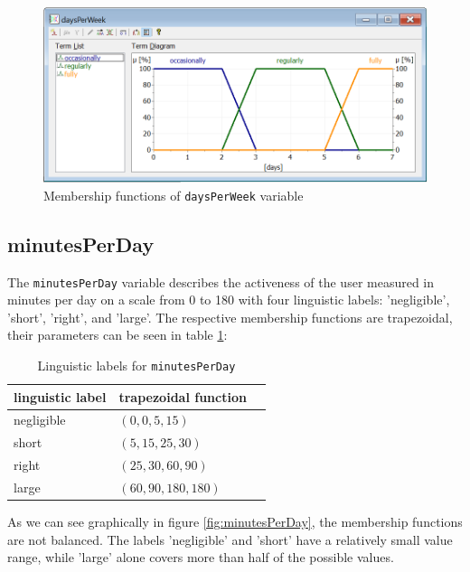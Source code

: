 \begin{figure}[H]
\centering
\includegraphics[width=\textwidth]{img/vDaysPerWeek}
\caption{Membership functions of \texttt{daysPerWeek} variable}
\label{fig:daysPerWeek} 
\end{figure}

\subsection{minutesPerDay}

The \texttt{minutesPerDay} variable describes the activeness of the user measured in minutes per day on a scale from 0 to 180 with four linguistic labels: 'negligible', 'short', 'right',  and 'large'. The respective membership functions are trapezoidal, their parameters can be seen in table \ref{tab:minutesPerDay}:

\begin{table}[H]
\centering
\begin{tabular}{@{}lll@{}}
\toprule
\textbf{linguistic label}  & \textbf{trapezoidal function} \\ 
\midrule
negligible  & $(0,0,5,15)$ \\
short & $(5,15,25,30)$ \\
right & $(25,30,60,90)$ \\
large & $(60,90,180,180)$ \\
\bottomrule
\end{tabular}
\caption{Linguistic labels for \texttt{minutesPerDay}}
\label{tab:minutesPerDay}
\end{table}

As we can see graphically in figure \ref{fig:minutesPerDay}, the membership functions are not balanced. The labels 'negligible' and 'short' have a relatively small value range, while 'large' alone covers more than half of the possible values.

